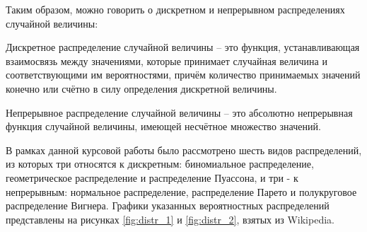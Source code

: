 \documentclass[14pt, russian]{scrartcl}
\begin{document}
Таким образом, можно говорить о дискретном и непрерывном распределениях случайной величины:

Дискретное распределение случайной величины -- это функция, устанавливающая взаимосвязь между значениями, которые принимает случайная величина и соответствующими им вероятностями, причём количество принимаемых значений конечно или счётно в силу определения дискретной величины\cite{teorver1}.

Непрерывное распределение случайной величины -- это абсолютно непрерывная функция случайной величины, имеющей несчётное множество значений.

В рамках данной курсовой работы было рассмотрено шесть видов распределений, из которых три относятся к дискретным: биномиальное распределение, геометрическое распределение и распределение Пуассона, и три - к непрерывным: нормальное распределение, распределение Парето и полукруговое распределение Вигнера. Графики указанных вероятностных распределений представлены на рисунках \ref{fig:distr_1} и \ref{fig:distr_2}, взятых из Wikipedia.
\end{document}
